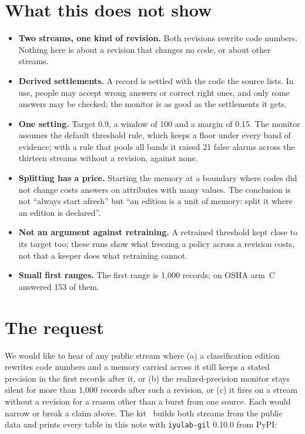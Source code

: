\documentclass[11pt]{article}
\begin{document}
\section{What this does not show}

\begin{itemize}
  \item \textbf{Two streams, one kind of revision.} Both revisions rewrite code numbers. Nothing here is about a
  revision that changes no code, or about other streams.
  \item \textbf{Derived settlements.} A record is settled with the code the source lists. In use, people may accept
  wrong answers or correct right ones, and only some answers may be checked; the monitor is as good as the settlements it
  gets.
  \item \textbf{One setting.} Target 0.9, a window of 100 and a margin of 0.15. The monitor assumes the default threshold
  rule, which keeps a floor under every band of evidence; with a rule that pools all bands it raised 21 false alarms
  across the thirteen streams without a revision, against none.
  \item \textbf{Splitting has a price.} Starting the memory at a boundary where codes did not change costs answers on
  attributes with many values. The conclusion is not ``always start afresh'' but ``an edition is a unit of memory: split
  it where an edition is declared''.
  \item \textbf{Not an argument against retraining.} A retrained threshold kept close to its target too; these runs
  show what freezing a policy across a revision costs, not that a keeper does what retraining cannot.
  \item \textbf{Small first ranges.} The first range is 1{,}000 records; on OSHA arm~C answered 153 of them.
\end{itemize}

\section{The request}

We would like to hear of any public stream where (a) a classification edition rewrites code numbers and a memory
carried across it still keeps a stated precision in the first records after it, or (b) the realized-precision monitor
stays silent for more than 1{,}000 records after such a revision, or (c) it fires on a stream without a revision for a
reason other than a burst from one source. Each would narrow or break a claim above. The kit~\cite{kit} builds both
streams from the public data and prints every table in this note with \texttt{iyulab-gil} 0.10.0 from PyPI:
\end{document}
